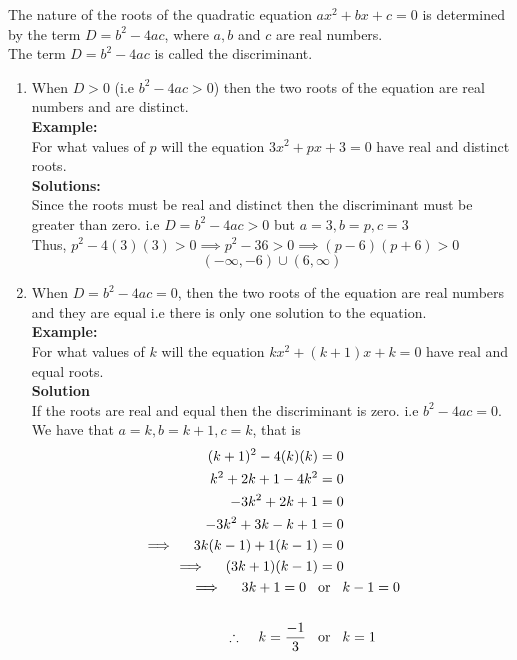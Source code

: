 \documentclass[11pt,a4paper]{article}
\begin{document}
The nature of the roots of the quadratic equation $ax^2+bx+c=0$ is determined by the term $D=b^2-4ac$, where $a,b$ and $c$ are real numbers.\\

The term $D=b^2-4ac$ is called the discriminant.

\begin{enumerate}
\item When $D>0$ (i.e $b^2-4ac>0$) then the two roots of the equation are real numbers and are distinct.\\

\textbf{Example:}\\
For what values of $p$ will the equation $3x^2+px+3=0$ have real and distinct roots.\\

\textbf{Solutions:}\\
Since the roots must be real and distinct then the discriminant must be greater than zero. i.e $D=b^2-4ac>0$ but $a=3, b=p, c=3$\\

Thus, $p^2-4(3)(3)>0\implies p^2-36>0\implies (p-6)(p+6)>0$
$$(-\infty,-6)\cup (6,\infty)$$

\item When $D=b^2-4ac=0$, then the two roots of the equation are real numbers and they are equal i.e there is only one solution to the equation.\\

\textbf{Example:}\\
For what values of $k$ will the equation $kx^2+(k+1)x+k=0$ have real and equal roots.\\

\textbf{Solution}\\
If the roots are real and equal then the discriminant is zero. i.e $b^2-4ac=0$.\\
We have that $a=k, b=k+1, c=k$, that is 
\begin{align*}
(k+1)^2-4(k)(k) & = 0\\
k^2+2k+1-4k^2 & =0\\
-3k^2+2k+1 & = 0\\
-3k^2+3k-k+1 & =0\\
\implies \hspace{0.4cm} 3k(k-1)+1(k-1) & =0\\
\implies \hspace{0.4cm} (3k+1)(k-1) & =0\\
\implies \hspace{0.4cm}3k+1=0\hspace{0.3cm} &\text{or}\hspace{0.3cm} k-1=0\\\\
\therefore \hspace{0.4cm} k=\frac{-1}{3}\hspace{0.3cm} & \text{or}\hspace{0.3cm} k=1\\
\end{align*}


\end{enumerate}
\end{document}
